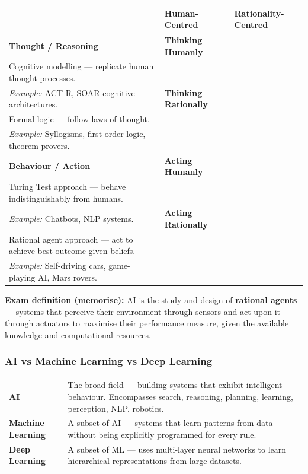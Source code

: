 \documentclass[12pt, a4paper]{article}
\newenvironment{answerbox}{\begin{mdframed}[style=answerframe]}{\end{mdframed}}
\begin{document}
\begin{center}
\renewcommand{\arraystretch}{1.6}
\begin{tabular}{p{5.5cm}|p{5.5cm}|p{5.5cm}}
\toprule
& \textbf{Human-Centred} & \textbf{Rationality-Centred} \\
\midrule
\textbf{Thought / Reasoning} &
  \textbf{Thinking Humanly} \\
  Cognitive modelling — replicate human thought processes. \\
  \emph{Example:} ACT-R, SOAR cognitive architectures. &
  \textbf{Thinking Rationally} \\
  Formal logic — follow laws of thought. \\
  \emph{Example:} Syllogisms, first-order logic, theorem provers. \\
\midrule
\textbf{Behaviour / Action} &
  \textbf{Acting Humanly} \\
  Turing Test approach — behave indistinguishably from humans. \\
  \emph{Example:} Chatbots, NLP systems. &
  \textbf{Acting Rationally} \\
  Rational agent approach — act to achieve best outcome given beliefs. \\
  \emph{Example:} Self-driving cars, game-playing AI, Mars rovers. \\
\bottomrule
\end{tabular}
\end{center}

\begin{answerbox}
\textbf{Exam definition (memorise):} AI is the study and design of \textbf{rational agents} — systems that perceive their environment through sensors and act upon it through actuators to maximise their performance measure, given the available knowledge and computational resources.
\end{answerbox}

\subsubsection*{AI vs Machine Learning vs Deep Learning}

\begin{center}
\renewcommand{\arraystretch}{1.3}
\begin{tabular}{l|p{10cm}}
\toprule
\textbf{AI} & The broad field — building systems that exhibit intelligent behaviour. Encompasses search, reasoning, planning, learning, perception, NLP, robotics. \\
\textbf{Machine Learning} & A subset of AI — systems that learn patterns from data without being explicitly programmed for every rule. \\
\textbf{Deep Learning} & A subset of ML — uses multi-layer neural networks to learn hierarchical representations from large datasets. \\
\bottomrule
\end{tabular}
\end{center}
\end{document}
